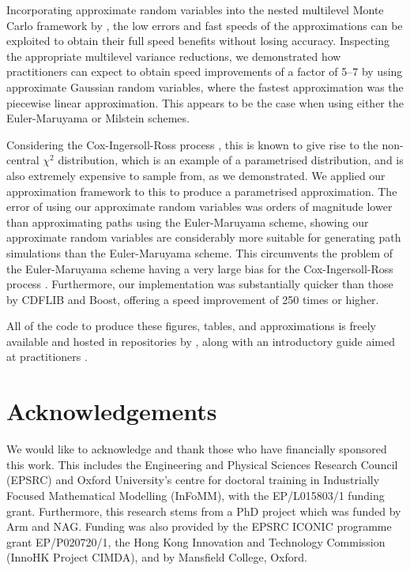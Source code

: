 \documentclass[manuscript,review]{acmart}
\begin{document}
Incorporating approximate random variables into the nested multilevel Monte Carlo framework by \citet{giles2020approximate}, the low errors and fast speeds of the approximations can be exploited to obtain their full speed benefits without losing accuracy. Inspecting the appropriate multilevel variance reductions, we demonstrated how practitioners can expect to obtain speed improvements of a factor of 5--7 by using approximate Gaussian random variables, where the fastest approximation was the piecewise linear approximation. This appears to be the case when using either the Euler-Maruyama or Milstein schemes. 

Considering the Cox-Ingersoll-Ross process \citep{cox1985theory}, this is known to give rise to the non-central $ \chi^2 $ distribution, which is an example of a parametrised distribution, and is also extremely expensive to sample from, as we demonstrated. We applied our approximation framework to this to produce a parametrised approximation. The error of using our approximate random variables was orders of magnitude lower than approximating paths using the Euler-Maruyama scheme, showing our approximate random variables are considerably more suitable for generating path simulations than the Euler-Maruyama scheme. This circumvents the problem of the Euler-Maruyama scheme having a very large bias for the Cox-Ingersoll-Ross process \citep{broadie2006exact}. Furthermore, our implementation was substantially quicker than those by CDFLIB and Boost, offering a speed improvement of 250 times or higher. 

All of the code to produce these figures, tables, and approximations is freely available and hosted in repositories by \citet{sheridan2020approximate_inverse,sheridan2020approximate_random}, along with an introductory guide aimed at practitioners \citep{sheridan2020approximate_random}.

\section{Acknowledgements}

We would like to acknowledge and thank those who have financially sponsored this work. This includes the Engineering and Physical Sciences Research Council (EPSRC) and Oxford University's centre for doctoral training in Industrially Focused Mathematical Modelling (InFoMM), with the EP/L015803/1 funding grant. Furthermore, this research stems from a PhD project \citep{sheridan2020nested} which was funded by Arm and NAG. Funding was also provided by the EPSRC ICONIC programme grant EP/P020720/1, the Hong Kong Innovation and Technology Commission (InnoHK Project CIMDA), and by Mansfield College, Oxford.  




\end{document}
